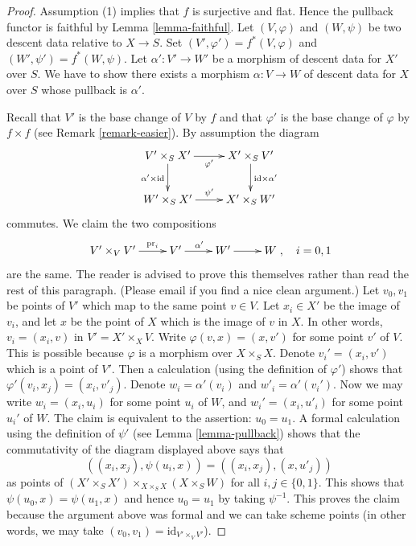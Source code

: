 \begin{proof}
Assumption (1) implies that $f$ is surjective and flat.
Hence the pullback functor is faithful by
Lemma \ref{lemma-faithful}.
Let $(V, \varphi)$ and $(W, \psi)$ be two descent data relative
to $X \to S$. Set $(V', \varphi') = f^*(V, \varphi)$ and
$(W', \psi') = f^*(W, \psi)$.
Let $\alpha' : V' \to W'$ be a morphism of descent data for $X'$ over $S$.
We have to show there exists a morphism $\alpha : V \to W$ of
descent data for $X$ over $S$ whose pullback is $\alpha'$.

\medskip\noindent
Recall that $V'$ is the base change of $V$ by $f$ and that
$\varphi'$ is the base change of $\varphi$ by $f \times f$
(see Remark \ref{remark-easier}).
By assumption the diagram
$$
\xymatrix{
V' \times_S X' \ar[r]_{\varphi'} \ar[d]_{\alpha' \times \text{id}} &
X' \times_S V' \ar[d]^{\text{id} \times \alpha'} \\
W' \times_S X' \ar[r]^{\psi'} &
X' \times_S W'
}
$$
commutes. We claim the two compositions
$$
\xymatrix{
V' \times_V V' \ar[r]^-{\text{pr}_i} &
V' \ar[r]^{\alpha'} &
W' \ar[r] &
W
}
, \quad i = 0, 1
$$
are the same. The reader is advised to prove this themselves rather
than read the rest of this paragraph. (Please email if you find a
nice clean argument.)
Let $v_0, v_1$ be points of $V'$ which map to the same point $v \in V$.
Let $x_i \in X'$ be the image of $v_i$, and let
$x$ be the point of $X$ which is the image of $v$ in $X$. In other words,
$v_i = (x_i, v)$ in $V' = X' \times_X V$. Write
$\varphi(v, x) = (x, v')$ for some point $v'$ of $V$.
This is possible because $\varphi$ is
a morphism over $X \times_S X$. Denote
$v_i' = (x_i, v')$ which is a point of $V'$.
Then a calculation (using the definition of $\varphi'$)
shows that $\varphi'(v_i, x_j) = (x_i, v'_j)$. Denote
$w_i = \alpha'(v_i)$ and $w'_i = \alpha'(v_i')$.
Now we may write $w_i = (x_i, u_i)$ for some point $u_i$ of $W$,
and $w_i' = (x_i, u'_i)$ for some point $u_i'$ of $W$.
The claim is equivalent to the assertion: $u_0 = u_1$.
A formal calculation using the definition of $\psi'$
(see Lemma \ref{lemma-pullback}) shows
that the commutativity of the diagram displayed above says that
$$
((x_i, x_j), \psi(u_i, x)) = ((x_i, x_j), (x, u'_j))
$$
as points of
$(X' \times_S X') \times_{X \times_S X} (X \times_S W)$
for all $i, j \in \{0, 1\}$. This shows that $\psi(u_0, x) = \psi(u_1, x)$
and hence $u_0 = u_1$ by taking $\psi^{-1}$.
This proves the claim because the argument above was formal
and we can take scheme points (in other words, we may
take $(v_0, v_1) = \text{id}_{V' \times_V V'}$).


\end{proof}
